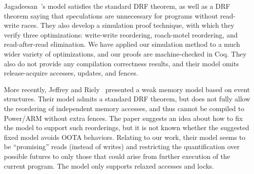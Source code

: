 
Jagadeesan~\etal's model satisfies the standard DRF theorem, as well
as a DRF theorem saying that speculations are unnecessary for programs
without read-write races.  They also develop a simulation proof
technique, with which they verify three optimizations: write-write
reordering, roach-motel reordering, and read-after-read elimination.
We have applied our simulation method to a much wider variety of
optimizations, and our proofs are machine-checked in Coq.  They also
do not provide any compilation correctness results, and their model
omits release-acquire accesses, updates, and fences.






More recently, Jeffrey and Riely~\cite{jeffrey:2016} presented a weak memory model based on event structures.
Their model admits a standard DRF theorem, but does not fully allow the reordering of independent memory accesses, 
and thus cannot be compiled to Power/ARM without extra fences.
The paper suggests an idea about how to fix the model to support such reorderings, 
but it is not known whether the suggested fixed model avoids OOTA behaviors.
Relating to our work, their model seems to be ``promising'' reads (instead of writes) and 
restricting the quantification over possible futures to only those that could arise from further execution of the current program.  The model only supports relaxed accesses and locks.


